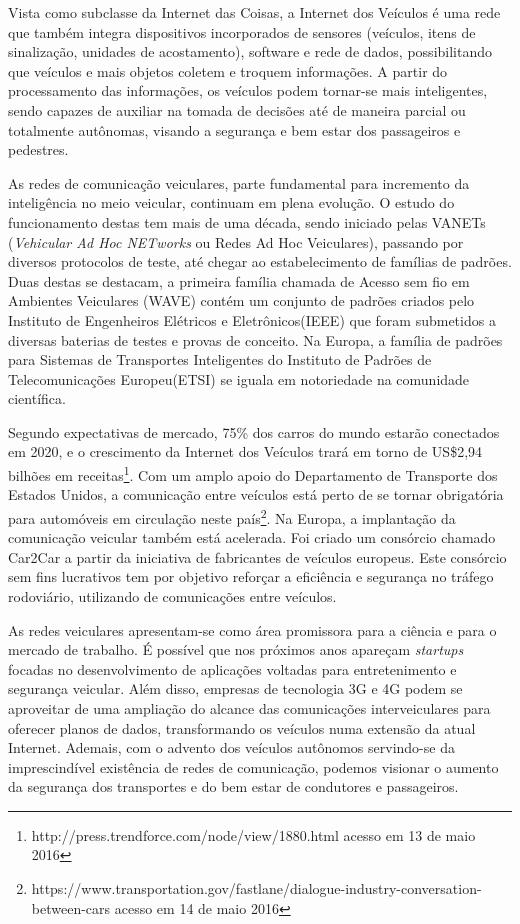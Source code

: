 \documentclass[
12pt,				%
openright,			%
oneside,			%
a4paper,			%
brazil,				%
]{abntex2}
\begin{document}
	\par Vista como subclasse da Internet das Coisas, a Internet dos Veículos é uma rede que também integra dispositivos incorporados de sensores (veículos, itens de sinalização, unidades de acostamento), software e rede de dados, possibilitando que veículos e mais objetos coletem e troquem informações. A partir do processamento das informações, os veículos podem tornar-se mais inteligentes, sendo capazes de auxiliar na tomada de decisões até de maneira parcial ou totalmente autônomas, visando a segurança e bem estar dos passageiros e pedestres.
	
	\par As redes de comunicação veiculares, parte fundamental para incremento da inteligência no meio veicular, continuam em plena evolução. O estudo do funcionamento destas tem mais de uma década, sendo iniciado pelas VANETs (\textit{Vehicular Ad Hoc NETworks} ou Redes Ad Hoc Veiculares), passando por diversos protocolos de teste, até chegar ao estabelecimento de famílias de padrões. Duas destas se destacam, a primeira família chamada de Acesso sem fio em Ambientes Veiculares (WAVE) contém um conjunto de padrões criados pelo Instituto de Engenheiros Elétricos e Eletrônicos(IEEE) que foram submetidos a diversas baterias de testes e provas de conceito. Na Europa, a família de padrões para Sistemas de Transportes Inteligentes do Instituto de Padrões de Telecomunicações Europeu(ETSI) se iguala em notoriedade na comunidade científica.
	
	\par Segundo expectativas de mercado, 75\% dos carros do mundo estarão conectados em 2020, e o crescimento da Internet dos Veículos trará em torno de US\$2,94 bilhões em receitas{\footnote{http://press.trendforce.com/node/view/1880.html acesso em 13 de maio 2016}}. Com um amplo apoio do Departamento de Transporte dos Estados Unidos, a comunicação entre veículos está perto de se tornar obrigatória para automóveis em circulação neste país{\footnote{https://www.transportation.gov/fastlane/dialogue-industry-conversation-between-cars acesso em 14 de maio 2016}}. Na Europa, a implantação da comunicação veicular também está acelerada. Foi criado um consórcio chamado Car2Car a partir da iniciativa de fabricantes de veículos europeus. Este consórcio sem fins lucrativos tem por objetivo reforçar a eficiência e segurança no tráfego rodoviário, utilizando de comunicações entre veículos.
	
	\par As redes veiculares apresentam-se como área promissora para a ciência e para o mercado de trabalho. É possível que nos próximos anos apareçam \textit{startups} focadas no desenvolvimento de aplicações voltadas para entretenimento e segurança veicular. Além disso, empresas de tecnologia 3G e 4G podem se aproveitar de uma ampliação do alcance das comunicações interveiculares para oferecer planos de dados, transformando os veículos numa extensão da atual Internet. Ademais, com o advento dos veículos autônomos servindo-se da imprescindível existência de redes de comunicação, podemos visionar o aumento da segurança dos transportes e do bem estar de condutores  e passageiros.
	
\end{document}
